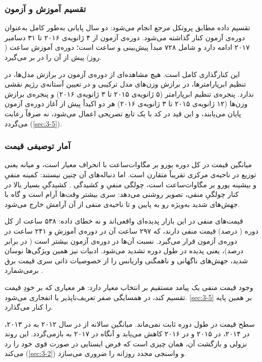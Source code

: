 \subsubsection*{تقسیم آموزش و آزمون}

تقسیم داده مطابق پروتکل مرجع انجام می‌شود: دو سال پایانی به‌طور کامل به‌عنوان دوره‌ی
آزمون کنار گذاشته می‌شود. دوره‌ی آزمون از ۴ ژانویه‌ی ۲۰۱۶ تا ۳۱ دسامبر ۲۰۱۷ ادامه
دارد و شامل ۷۲۸ مبدأ پیش‌بینی و  ساعت است؛ دوره‌ی آموزش  ساعت ( روز)
پیش از آن را در بر می‌گیرد.

این کنارگذاری کامل است. هیچ مشاهده‌ای از دوره‌ی آزمون در برازش مدل‌ها، در تنظیم
ابرپارامترها، در برازش وزن‌های مدل ترکیبی و در تعیین آستانه‌ی رژیم نقشی ندارد. پنجره‌ی
تنظیم ابرپارامتر (۵ ژانویه‌ی ۲۰۱۵ تا ۳ ژانویه‌ی ۲۰۱۶) و پنجره‌ی برازش وزن‌ها (۱۲
ژانویه‌ی ۲۰۱۵ تا ۳ ژانویه‌ی ۲۰۱۶) هر دو اکیداً پیش از آغاز دوره‌ی آزمون پایان می‌یابند،
و این قید در کد با یک تابع تصریحی اعمال می‌شود، نه صرفاً رعایت می‌گردد (\cref{sec:3-5}).

\subsubsection*{آمار توصیفی قیمت}

میانگین قیمت در کل دوره  یورو بر مگاوات‌ساعت با انحراف معیار  است، و
میانه   یعنی توزیع در ناحیه‌ی مرکزی تقریباً متقارن است. اما دنباله‌های آن
چنین نیستند: کمینه منفیِ  و بیشینه  یورو بر مگاوات‌ساعت است، چولگی
منفیِ  و کشیدگی . کشیدگیِ بسیار بالا در کنار چولگیِ منفی، تصویر روشنی
می‌دهد: سری بیشتر وقت‌ها آرام است و گاه با جهش‌های شدید  به‌ویژه رو به پایین و
تا ناحیه‌ی منفی  از آن آرامش خارج می‌شود.

قیمت‌های منفی در این بازار پدیده‌ای واقعی‌اند و نه خطای داده: ۵۳۸ ساعت از کل دوره
( درصد) قیمت منفی دارند، که ۲۹۷ ساعت آن در دوره‌ی آموزش و ۲۴۱ ساعت در دوره‌ی آزمون
قرار می‌گیرد. نسبت آن‌ها در دوره‌ی آزمون بیشتر است ( در برابر  درصد)، یعنی
پدیده در طول دوره تشدید می‌شود. ادبیات نیز همین ویژگی‌ها  نوسان شدید،
جهش‌های ناگهانی و ناهمگنی واریانس  را از خصوصیات ذاتی سری قیمت برق برمی‌شمارد
\cite{jiang_review_2018}.

وجود قیمت منفی یک پیامد مستقیم بر انتخاب معیار دارد: هر معیاری که بر خودِ قیمت تقسیم
کند، در همسایگی صفر تعریف‌ناپذیر یا انفجاری می‌شود. \cref{sec:3-5} بر همین پایه 
را کنار می‌گذارد.

سطح قیمت در طول دوره ثابت نمی‌ماند. میانگین سالانه از  در سال ۲۰۱۲ به  در
۲۰۱۳،  در ۲۰۱۴،  در ۲۰۱۵ و  در ۲۰۱۶ کاهش می‌یابد و آنگاه در ۲۰۱۷ به
 بازمی‌گردد. این روند نزولی و بازگشت آن، همان چیزی است که فرض ایستایی در صورت
قوی خود را رد می‌کند (\cref{sec:3-2}) و واسنجی مجدد روزانه را ضروری می‌سازد.


